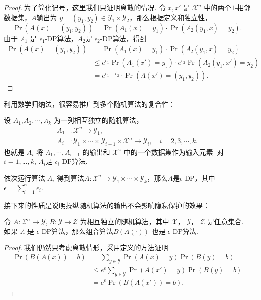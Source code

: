 \begin{proof}
为了简化记号，这里我们只证明离散的情况. 令 $x,x'$ 是 $\mathcal X^n$ 中的两个$1$-相邻数据集，$A$输出为 $y = (y_1, y_2) \in \mathcal Y_1 \times \mathcal Y_2$，那么根据定义和独立性，
    \[
    \Pr(A(x) = (y_1, y_2)) = \Pr(A_1(x) = y_1) \cdot \Pr(A_2(y_1, x) = y_2).
    \]
由于 $A_1$ 是 $\epsilon_1$-DP算法，$A_2$是 $\epsilon_2$-DP算法，得到
    \[
    \begin{aligned}
        \Pr(A(x) = (y_1, y_2)) &= \Pr(A_1(x) = y_1) \cdot \Pr(A_2(y_1, x) = y_2)\\
        &\leq e^{\epsilon_1} \Pr(A_1(x') = y_1) \cdot e^{\epsilon_2} \Pr(A_2(y_1, x') = y_2) \\
        &= e^{\epsilon_1 + \epsilon_2} \cdot \Pr(A(x') = (y_1, y_2)).
    \end{aligned}
    \]
\end{proof}

利用数学归纳法，很容易推广到多个随机算法的复合性：

\begin{proposition}\label{prop:composition-multi}
    设 $A_1, A_2, \cdots , A_k$ 为一列相互独立的随机算法， 
    \begin{align*}
        A_1&: \mathcal X^n \to \mathcal Y_1,\\
        A_i&: \mathcal Y_1 \times \cdots \times \mathcal Y_{i-1} \times \mathcal X^n \to \mathcal Y_i,\quad i = 2, 3, \cdots, k.
    \end{align*}
    也就是 $A_i$ 将 $A_1, \cdots, A_{i-1}$ 的输出和 $\mathcal X^n$ 中的一个数据集作为输入元素. 对$i=1,\dots,k$, $A_i$是 $\epsilon_i$-DP算法. 
        
    依次运行算法 $A_i$ 得到算法$A : \mathcal X^n \to \mathcal Y_1 \times \cdots \times \mathcal Y_k$，那么$A$是$\epsilon$-DP，其中$\epsilon = \sum_{i=1}^n \epsilon_i$.
\end{proposition}

接下来的性质是说明操纵随机算法的输出不会影响隐私保护的效果：

\begin{proposition}[后处理]\label{prop:post-processing}
    令 $A : \mathcal X^n \to \mathcal Y$, $B : \mathcal Y \to \mathcal Z$ 为相互独立的随机算法，其中 $\mathcal X$， $\mathcal Y$， $\mathcal Z$ 是任意集合. 如果 $A$ 是 $\epsilon$-DP算法，那么组合算法$ B(A(\cdot))$ 也是 $\epsilon$-DP算法.
\end{proposition}
\begin{proof}
我们仍然只考虑离散情形，采用定义的方法证明
    \[
    \begin{aligned}
        \Pr(B(A(x)) = b) &= \sum_{y \in \mathcal Y} \Pr(A(x) = y) \Pr(B(y) = b) \\
        &\leq e^{\epsilon} \sum_{y\in \mathcal Y}\Pr(A(x') = y)\Pr(B(y) = b)\\
        &= e^{\epsilon}\Pr(B(A(x')) = b).
    \end{aligned}
    \]
\end{proof}

